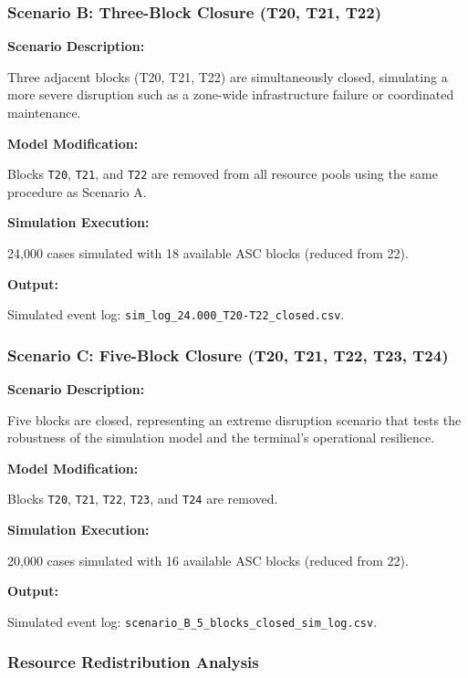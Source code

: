         \subsubsection{Scenario B: Three-Block Closure (T20, T21, T22)}
        
        \textbf{Scenario Description:}
        
        Three adjacent blocks (T20, T21, T22) are simultaneously closed, simulating a more severe disruption such as a zone-wide infrastructure failure or coordinated maintenance.
        
        \textbf{Model Modification:}
        
        Blocks \texttt{T20}, \texttt{T21}, and \texttt{T22} are removed from all resource pools using the same procedure as Scenario A.
        
        \textbf{Simulation Execution:}
        
        24,000 cases simulated with 18 available ASC blocks (reduced from 22).
        
        \textbf{Output:}
        
        Simulated event log: \texttt{sim\_log\_24.000\_T20-T22\_closed.csv}.

        \subsubsection{Scenario C: Five-Block Closure (T20, T21, T22, T23, T24)}
        
        \textbf{Scenario Description:}
        
        Five blocks are closed, representing an extreme disruption scenario that tests the robustness of the simulation model and the terminal's operational resilience.
        
        \textbf{Model Modification:}
        
        Blocks \texttt{T20}, \texttt{T21}, \texttt{T22}, \texttt{T23}, and \texttt{T24} are removed.
        
        \textbf{Simulation Execution:}
        
        20,000 cases simulated with 16 available ASC blocks (reduced from 22).
        
        \textbf{Output:}
        
        Simulated event log: \texttt{scenario\_B\_5\_blocks\_closed\_sim\_log.csv}.

        \subsubsection{Resource Redistribution Analysis}
        
